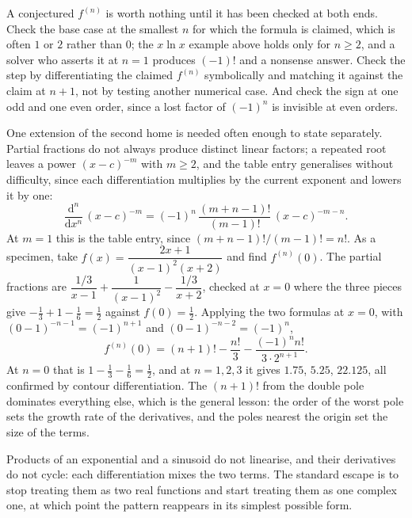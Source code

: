 \begin{keynote}
A conjectured $f^{(n)}$ is worth nothing until it has been checked at both ends. Check the base case at the smallest $n$ for which the formula is claimed, which is often $1$ or $2$ rather than $0$; the $x\ln x$ example above holds only for $n\geq2$, and a solver who asserts it at $n=1$ produces $(-1)!$ and a nonsense answer. Check the step by differentiating the claimed $f^{(n)}$ symbolically and matching it against the claim at $n+1$, not by testing another numerical case. And check the sign at one odd and one even order, since a lost factor of $(-1)^{n}$ is invisible at even orders.
\end{keynote}

One extension of the second home is needed often enough to state separately. Partial fractions do not always produce distinct linear factors; a repeated root leaves a power $(x-c)^{-m}$ with $m\geq2$, and the table entry generalises without difficulty, since each differentiation multiplies by the current exponent and lowers it by one:
\[
\frac{\mathrm{d}^{n}}{\mathrm{d}x^{n}}\,(x-c)^{-m}=(-1)^{n}\,\frac{(m+n-1)!}{(m-1)!}\,(x-c)^{-m-n} .
\]
At $m=1$ this is the table entry, since $(m+n-1)!/(m-1)!=n!$. As a specimen, take $f(x)=\dfrac{2x+1}{(x-1)^{2}(x+2)}$ and find $f^{(n)}(0)$. The partial fractions are $\dfrac{1/3}{x-1}+\dfrac{1}{(x-1)^{2}}-\dfrac{1/3}{x+2}$, checked at $x=0$ where the three pieces give $-\tfrac13+1-\tfrac16=\tfrac12$ against $f(0)=\tfrac12$. Applying the two formulas at $x=0$, with $(0-1)^{-n-1}=(-1)^{n+1}$ and $(0-1)^{-n-2}=(-1)^{n}$,
\[
f^{(n)}(0)=(n+1)!-\frac{n!}{3}-\frac{(-1)^{n}n!}{3\cdot2^{n+1}} .
\]
At $n=0$ that is $1-\tfrac13-\tfrac16=\tfrac12$, and at $n=1,2,3$ it gives $1.75$, $5.25$, $22.125$, all confirmed by contour differentiation. The $(n+1)!$ from the double pole dominates everything else, which is the general lesson: the order of the worst pole sets the growth rate of the derivatives, and the poles nearest the origin set the size of the terms.

Products of an exponential and a sinusoid do not linearise, and their derivatives do not cycle: each differentiation mixes the two terms. The standard escape is to stop treating them as two real functions and start treating them as one complex one, at which point the pattern reappears in its simplest possible form.


